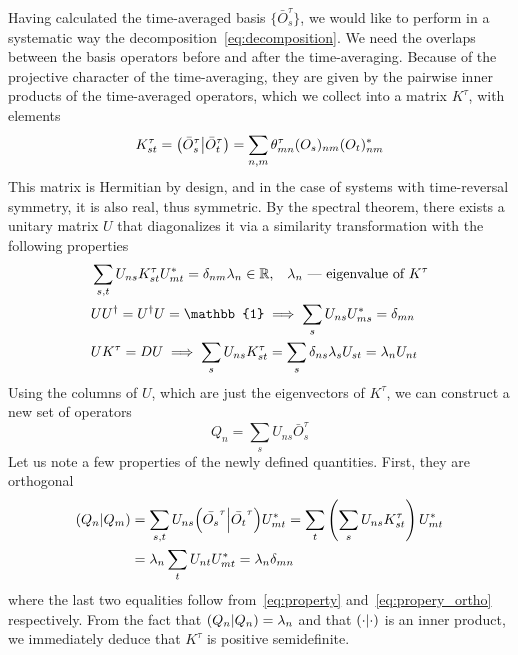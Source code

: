 Having calculated the time-averaged basis \( \{\bar{O}_s^{\tau}\} \), we would like to perform in a 
systematic way the decomposition~\ref{eq:decomposition}. We need the overlaps between the basis operators
before and after the time-averaging. Because of the projective character of the time-averaging, they are
given by the pairwise inner products of the time-averaged operators, which we collect into a matrix
\(K^{\tau}\), with elements
\begin{equation}
    K^{\tau}_{st} = \left(\bar{O}_s^{\tau} \middle| \bar{O}_t^{\tau}\right) = \sum_{n,m} \theta_{mn}^{\tau} (O_s)_{nm} (O_t)_{nm}^{\ast}
    \label{eq:overlap_matrix}
\end{equation}
This matrix is Hermitian by design, and in the case of systems with time-reversal symmetry, it is also real,
thus symmetric. By the spectral theorem, there exists a unitary matrix \(U\) that diagonalizes it
via a similarity transformation with the following properties
\begin{align}
    &\sum_{s, t} U_{n s} K_{s t}^{\tau} U_{m t}^{\ast}=\delta_{nm} \lambda_{n} \in
     \RR,\;\;\; \lambda_n \text{ --- eigenvalue of }K^{\tau} \label{eq:property diag} \\
    &UU^{\dag} = U^{\dag}U = \mathbb{1} \implies \sum_{s} U_{ns}U_{ms}^{\ast} =
     \delta_{mn} \label{eq:propery_ortho}\\
    & U K^{\tau} = D U \implies \sum_s U_{ns} K_{st}^{\tau} = \sum_s  \delta_{ns} \lambda_s U_{st} = \lambda_n U_{nt}\label{eq:property}
  \end{align} 
Using the columns of \(U\), which are just the eigenvectors of \(K^{\tau}\), we can construct a new set of operators
\begin{equation}
    Q_{n} = \sum_{s} U_{n s} \bar{O}_s^{\tau}
    \label{eq:liom}
\end{equation}
Let us note a few properties of the newly defined quantities. First, they are orthogonal
\begin{align}
    \left(Q_n \middle| Q_m\right) &= \sum_{s,t} U_{ns} {\left(\bar{O_s}^{\tau} \middle| \bar{O_t}^{\tau}\right)} U_{mt}^{\ast} 
    = \sum_{t} \left(\sum_{s}U_{ns} K_{st}^{\tau}\right)  U_{mt}^{\ast}\nonumber \\ 
    &= \lambda_n \sum_t U_{nt} U_{mt}^{\ast} = \lambda_n \delta_{mn}
  \end{align}
where the last two equalities follow from~\eqref{eq:property} and~\eqref{eq:propery_ortho} respectively.
From the fact that \(\left(Q_n \middle| Q_n\right) = \lambda_n\) and that \(\left(\cdot \middle| \cdot\right)\) is an inner product,
we immediately deduce that \(K^{\tau}\) is positive semidefinite.
